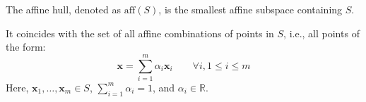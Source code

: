 \begin{definition}
    The affine hull, denoted as $\text{aff}(S)$, is the smallest affine subspace containing $S$.
\end{definition}
It coincides with the set of all affine combinations of points in $S$, i.e., all points of the form: 
\[\mathbf{x} = \sum_{i=1}^{m} \alpha_i \mathbf{x}_i\qquad\forall i, 1 \leq i \leq m\]  
Here, $\mathbf{x}_1, \dots, \mathbf{x}_m \in S$, $\sum_{i=1}^{m} \alpha_i = 1$, and $\alpha_i \in \mathbb{R}$.